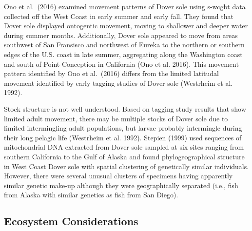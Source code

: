 \documentclass[11pt,
  english,
  a4paper,
]{article}
\begin{document}

Ono et al.~{(2016)\leavevmode\tagmcend\tagstructend} examined movement patterns of Dover sole using \Gls{s-wcgbt} data collected off the West Coast in early summer and early fall. They found that Dover sole displayed ontogentic movement, moving to shallower and deeper water during summer months. Additionally, Dover sole appeared to move from areas southwest of San Fransisco and northwest of Eureka to the northern or southern edges of the U.S. coast in late summer, aggregating along the Washington coast and south of Point Conception in California {(Ono et al. 2016)\leavevmode\tagmcend\tagstructend}. This movement pattern identified by Ono et al.~{(2016)\leavevmode\tagmcend\tagstructend} differs from the limited latitudal movement identified by early tagging studies of Dover sole {(Westrheim et al. 1992)\leavevmode\tagmcend\tagstructend}.

\leavevmode\tagmcend\tagstructend\par


Stock structure is not well understood. Based on tagging study results that show limited adult movement, there may be multiple stocks of Dover sole due to limited intermingling adult populations, but larvae probably intermingle during their long pelagic life {(Westrheim et al. 1992)\leavevmode\tagmcend\tagstructend}. Stepien {(1999)\leavevmode\tagmcend\tagstructend} used sequences of mitochondrial DNA extracted from Dover sole sampled at six sites ranging from southern California to the Gulf of Alaska and found phylogeographical structure in West Coast Dover sole with spatial clustering of genetically similar individuals. However, there were several unusual clusters of specimens having apparently similar genetic make-up although they were geographically separated (i.e., fish from Alaska with similar genetics as fish from San Diego).

\leavevmode\tagmcend\tagstructend\par


\hypertarget{ecosystem-considerations-1}{%
\subsection{Ecosystem Considerations}\label{ecosystem-considerations-1}}
\end{document}
